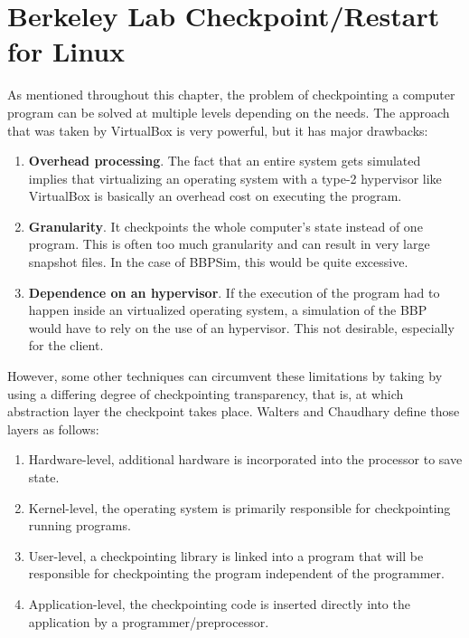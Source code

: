 \section{Berkeley Lab Checkpoint/Restart for Linux}\label{sec:blcr}
As mentioned throughout this chapter, the problem of checkpointing a computer program can be solved at multiple levels depending on the needs. The approach that was taken by VirtualBox is very powerful, but it has major drawbacks:
\begin{enumerate}
	\item \textbf{Overhead processing}. The fact that an entire system gets simulated implies that virtualizing an operating system with a type-2 hypervisor like VirtualBox is basically an overhead cost on executing the program. 
	\item \textbf{Granularity}. It checkpoints the whole computer's state instead of one program. This is often too much granularity and can result in very large snapshot files. In the case of \gls{BBPSim}, this would be quite excessive.
	\item \textbf{Dependence on an hypervisor}. If the execution of the program had to happen inside an virtualized operating system, a simulation of the \gls{BBP} would have to rely on the use of an hypervisor. This not desirable, especially for the client.
\end{enumerate}

However, some other techniques can circumvent these limitations by taking by using a differing degree of checkpointing transparency, that is, at which abstraction layer the checkpoint takes place. Walters and Chaudhary define those layers as follows: 
\begin{shadedquotation}
\begin{enumerate}
	\item Hardware-level, additional hardware is incorporated into the processor to
save state.
	\item Kernel-level, the operating system is primarily responsible for checkpointing
running programs.
	\item User-level, a checkpointing library is linked into a program that will be responsible for checkpointing the program independent of the programmer.
	\item Application-level, the checkpointing code is inserted directly into the application by a programmer/preprocessor.
\end{enumerate}
\cite{paper:app-level-chkpt}
\end{shadedquotation}

